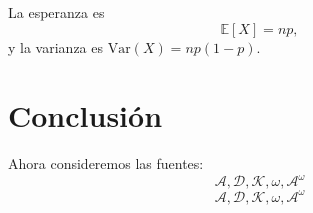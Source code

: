 La esperanza es
\begin{equation}
  \mathbb{E}[X] = np,
\end{equation}
y la varianza es $\mathrm{Var}(X) = np(1-p)$.

\lipsum[11-12]

\section{Conclusión}
\lipsum[13-14]

Ahora consideremos las fuentes:
\[ \mathscr{A}, \mathscr{D}, \mathscr{K}, \omega, \mathscr{A}^\omega \]
\[ \mathcal{A}, \mathcal{D}, \mathcal{K}, \omega, \mathcal{A}^\omega \]
